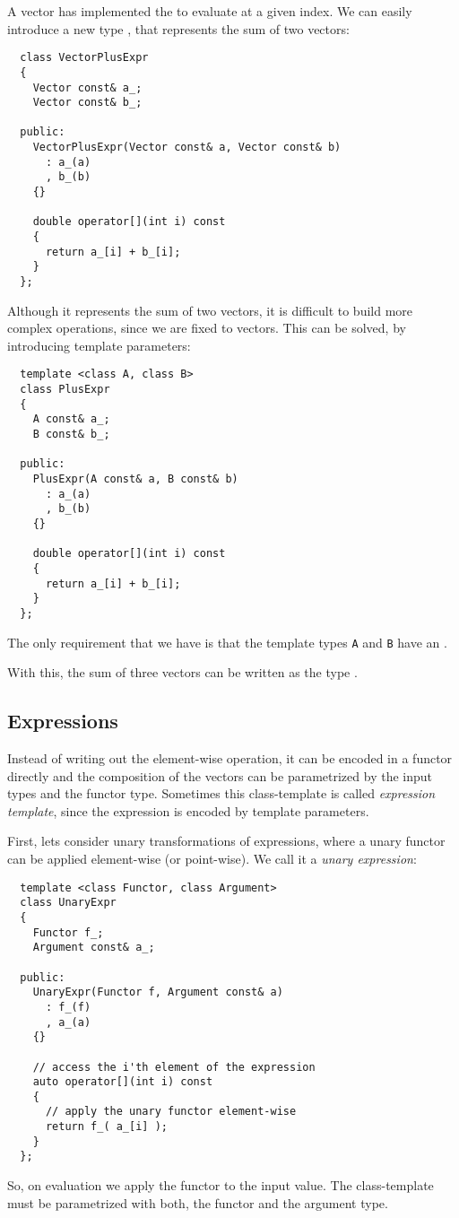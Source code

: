 \begin{example}
  A vector has implemented the  to evaluate at a given index. We can easily introduce a new type , that represents the sum of
  two vectors:
  \begin{verbatim}
  class VectorPlusExpr
  {
    Vector const& a_;
    Vector const& b_;

  public:
    VectorPlusExpr(Vector const& a, Vector const& b)
      : a_(a)
      , b_(b)
    {}

    double operator[](int i) const
    {
      return a_[i] + b_[i];
    }
  };
  \end{verbatim}

  Although it represents the sum of two vectors, it is difficult to build more complex operations, since we are fixed to vectors. This can be
  solved, by introducing template parameters:
  \begin{verbatim}
  template <class A, class B>
  class PlusExpr
  {
    A const& a_;
    B const& b_;

  public:
    PlusExpr(A const& a, B const& b)
      : a_(a)
      , b_(b)
    {}

    double operator[](int i) const
    {
      return a_[i] + b_[i];
    }
  };
  \end{verbatim}
  The only requirement that we have is that the template types \texttt{A} and \texttt{B} have an .

  With this, the sum of three vectors can be written as the type .
\end{example}


\subsection{Expressions}
Instead of writing out the element-wise operation, it can be encoded in a functor directly and the composition of the vectors can be
parametrized by the input types and the functor type. Sometimes this class-template is called \emph{expression template}, since the
expression is encoded by template parameters.

First, lets consider unary transformations of expressions, \ie where a unary functor can be applied element-wise (or point-wise).
We call it a \emph{unary expression}:
%
\begin{verbatim}
  template <class Functor, class Argument>
  class UnaryExpr
  {
    Functor f_;
    Argument const& a_;

  public:
    UnaryExpr(Functor f, Argument const& a)
      : f_(f)
      , a_(a)
    {}

    // access the i'th element of the expression
    auto operator[](int i) const
    {
      // apply the unary functor element-wise
      return f_( a_[i] );
    }
  };
\end{verbatim}
%
So, on evaluation we apply the functor to the input value. The class-template must be parametrized with both, the functor and the argument type.

